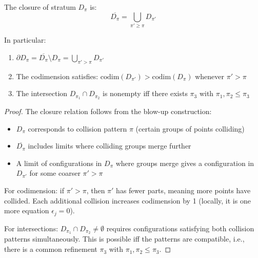 \begin{theorem}\label{thm:closure-relations}
The closure of stratum $D_\pi$ is:
\[\overline{D_\pi} = \bigcup_{\pi' \geq \pi} D_{\pi'}\]

In particular:
\begin{enumerate}
\item $\partial D_\pi = \overline{D_\pi} \setminus D_\pi = \bigcup_{\pi' > \pi} D_{\pi'}$
\item The codimension satisfies: $\text{codim}(D_{\pi'}) > \text{codim}(D_\pi)$ whenever $\pi' > \pi$
\item The intersection $D_{\pi_1} \cap D_{\pi_2}$ is nonempty iff there exists $\pi_3$ with $\pi_1, \pi_2 \leq \pi_3$
\end{enumerate}
\end{theorem}

\begin{proof}
The closure relation follows from the blow-up construction:
\begin{itemize}
\item $D_\pi$ corresponds to collision pattern $\pi$ (certain groups of points colliding)
\item $\overline{D_\pi}$ includes limits where colliding groups merge further
\item A limit of configurations in $D_\pi$ where groups merge gives a configuration in $D_{\pi'}$ for some coarser $\pi' > \pi$
\end{itemize}

For codimension: if $\pi' > \pi$, then $\pi'$ has fewer parts, meaning more points have collided. Each additional collision increases codimension by 1 (locally, it is one more equation $\epsilon_j = 0$).

For intersections: $D_{\pi_1} \cap D_{\pi_2} \neq \emptyset$ requires configurations satisfying both collision patterns simultaneously. This is possible iff the patterns are compatible, i.e., there is a common refinement $\pi_3$ with $\pi_1, \pi_2 \leq \pi_3$.
\end{proof}

